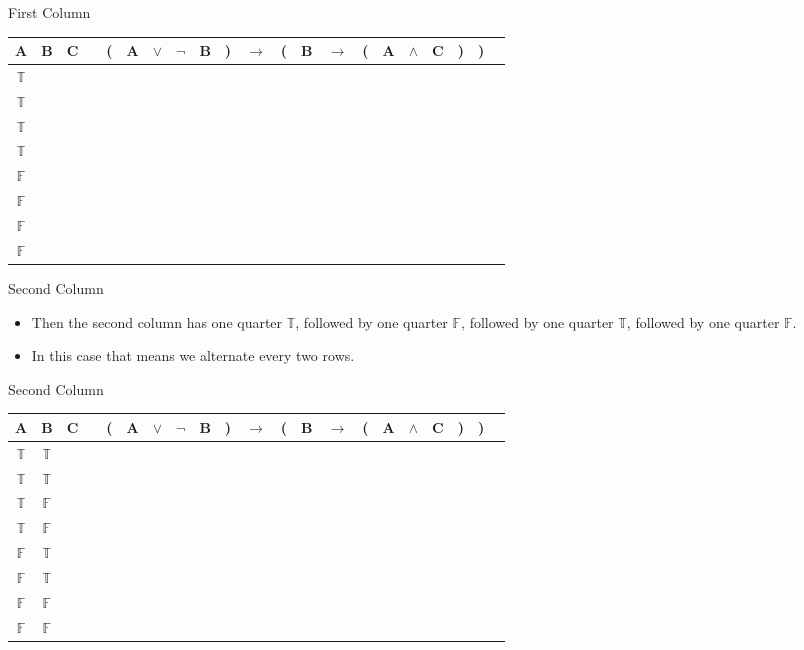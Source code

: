 \documentclass[
  ignorenonframetext,
]{beamer}
\providecommand{\tightlist}{%
  \setlength{\itemsep}{0pt}\setlength{\parskip}{0pt}}
\renewcommand{\,}{\text{, }}
\def\True{\mathbb{T}}
\def\False{\mathbb{F}}
\begin{document}
\begin{frame}{First Column}
\protect\hypertarget{first-column}{}
\begin{center}
\begin{tabular}{@{ }c@{ }@{ }c@{ }@{ }c | c@{ }@{}c@{}@{ }c@{ }@{ }c@{ }@{ }c@{ }@{ }c@{ }@{}c@{}@{ }c@{ }@{}c@{}@{ }c@{ }@{ }c@{ }@{}c@{}@{ }c@{ }@{ }c@{ }@{ }c@{ }@{}c@{}@{}c@{}@{ }c}
A & B & C &  & ( & A & $\vee$ & $\neg$ & B & ) & $\rightarrow$ & ( & B & $\rightarrow$ & ( & A & $\wedge$ & C & ) & ) & \\
\hline 
 $\True$ & & \\
 $\True$ & & \\
 $\True$ & & \\
 $\True$ & & \\
 $\False$ & &\\
 $\False$ & &\\
 $\False$ & &\\
 $\False$ & &\\
\end{tabular}
\end{center}
\end{frame}

\begin{frame}{Second Column}
\protect\hypertarget{second-column}{}
\begin{itemize}
\tightlist
\item
  Then the second column has one quarter \(\True\), followed by one
  quarter \(\False\), followed by one quarter \(\True\), followed by one
  quarter \(\False\).
\item
  In this case that means we alternate every two rows.
\end{itemize}
\end{frame}

\begin{frame}{Second Column}
\protect\hypertarget{second-column-1}{}
\begin{center}
\begin{tabular}{@{ }c@{ }@{ }c@{ }@{ }c | c@{ }@{}c@{}@{ }c@{ }@{ }c@{ }@{ }c@{ }@{ }c@{ }@{}c@{}@{ }c@{ }@{}c@{}@{ }c@{ }@{ }c@{ }@{}c@{}@{ }c@{ }@{ }c@{ }@{ }c@{ }@{}c@{}@{}c@{}@{ }c}
A & B & C &  & ( & A & $\lor$ & $\neg$ & B & ) & $\rightarrow$ & ( & B & $\rightarrow$ & ( & A & $\wedge$ & C & ) & ) & \\
\hline 
 $\True$ & $\True$ &\\
 $\True$ & $\True$ &\\
 $\True$ & $\False$ &\\
 $\True$ & $\False$ & \\
 $\False$ & $\True$ &\\
 $\False$ & $\True$ &\\
 $\False$ & $\False$ &\\
 $\False$ & $\False$ &\\
\end{tabular}
\end{center}
\end{frame}
\end{document}
